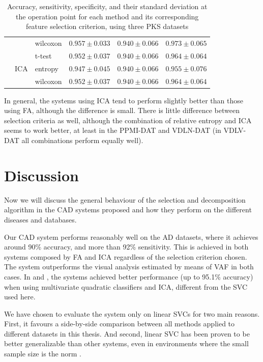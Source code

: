 \begin{table}
\begin{tabularx}{\linewidth}{Xllccc}
		&  & wilcoxon & $ 0.957 \pm 0.033 $ & $ 0.940 \pm 0.066 $ & $ 0.973 \pm 0.065 $ \\
		\cline{2-6}
		& \multirow{3}{*}{\ac{ICA}} & t-test & $ 0.952 \pm 0.037 $ & $ 0.940 \pm 0.066 $ & $ 0.964 \pm 0.064 $ \\
		&  & entropy & $ 0.947 \pm 0.045 $ & $ 0.940 \pm 0.066 $ & $ 0.955 \pm 0.076 $ \\
		&  & wilcoxon & $ 0.952 \pm 0.037 $ & $ 0.940 \pm 0.066 $ & $ 0.964 \pm 0.064 $ \\
		\bottomrule
	\end{tabularx}
	\caption[Performance values for the Parkinson's datasets]{Accuracy, sensitivity, specificity, and their standard deviation at the operation point for each method and its corresponding feature selection criterion, using three \protect\ac{PKS} datasets }
	\label{tab:featurePKS}
\end{table}

In general, the systems using \ac{ICA} tend to perform slightly better than those using \ac{FA}, although the difference is small. There is little difference between selection criteria as well, although the combination of relative entropy and \ac{ICA} seems to work better, at least in the PPMI-DAT and VDLN-DAT (in VDLV-DAT all combinations perform equally well). 


\FloatBarrier
\section{Discussion}
Now we will discuss the general behaviour of the selection and decomposition algorithm in the \ac{CAD} systems proposed and how they perform on the different diseases and databases. 

Our \ac{CAD} system performs reasonably well on the \ac{AD} datasets, where it achieves around 90\% accuracy, and more than 92\% sensitivity. This is achieved in both systems composed by \ac{FA} and \ac{ICA} regardless of the selection criterion chosen. The system outperforms the visual analysis estimated by means of \ac{VAF} \cite{Stoeckel04} in both cases. In \cite{Martinez201141} and \cite{Martinez-Murcia20129676}, the systems achieved better performance (up to 95.1\% accuracy) when using multivariate quadratic classifiers and \ac{ICA}, different from the \ac{SVC} used here. 

We have chosen to evaluate the system only on linear \acp{SVC} for two main reasons. First, it favours a side-by-side comparison between all methods applied to different datasets in this thesis. And second, linear \ac{SVC} has been proven to be better generalizable than other systems, even in environments where the small sample size is the norm \cite{Vapnik1997}. 

